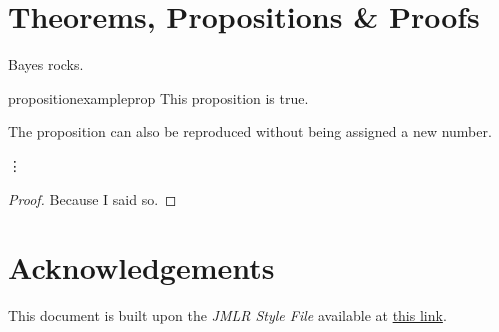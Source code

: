 \documentclass{article}
\begin{document}
\section{Theorems, Propositions \& Proofs}

\begin{axiom}
Bayes rocks.
\end{axiom}


\begin{restatable}[]{proposition}{exampleprop} \label{prop:exampleprop}
This proposition is true.
\end{restatable}

The proposition can also be reproduced without being assigned a new number.

\vdots

\exampleprop*
\begin{proof}
Because I said so.	
\end{proof}

\section*{Acknowledgements}

This document is built upon the \emph{JMLR Style File} available at \href{https://github.com/JmlrOrg/jmlr-style-file}{this link}.


\end{document}
